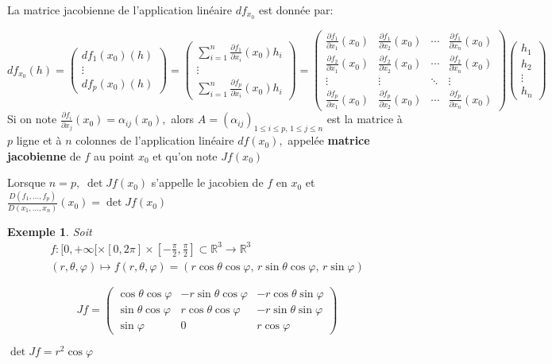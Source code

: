 \documentclass[11pt,a4paper]{report}
\newtheorem{ex}{Exemple}[section]
\begin{document}
La matrice jacobienne de l'application linéaire $df_{x_0}$ est donnée par:

\begin{equation*}
df_{x_0}(h)=
\begin{pmatrix}
d f_1(x_0)(h)\\
\vdots \\
d f_p(x_0)(h)
\end{pmatrix}=
\begin{pmatrix}
\sum\limits_{i=1}^{n}\frac{\partial f_1}{\partial x_i}(x_0) h_i\\
\vdots \\
\sum\limits_{i=1}^{n}\frac{\partial f_p}{\partial x_i}(x_0) h_i
\end{pmatrix}
=\begin{pmatrix}
\frac{\partial f_1}{\partial x_1}(x_0) & \frac{\partial f_1}{\partial x_2}(x_0) & \cdots & \frac{\partial f_1}{\partial x_n}(x_0) \\
\frac{\partial f_2}{\partial x_1}(x_0) & \frac{\partial f_2}{\partial x_2}(x_0) & \cdots & \frac{\partial f_2}{\partial x_n}(x_0) \\
\vdots & \vdots & \ddots & \vdots \\
\frac{\partial f_p}{\partial x_1}(x_0) & \frac{\partial f_p}{\partial x_2}(x_0) & \cdots & \frac{\partial f_p}{\partial x_n}(x_0)
\end{pmatrix}
\begin{pmatrix}
h_1\\
h_2\\
\vdots\\
h_n
\end{pmatrix}
\end{equation*}
Si on note $\frac{\partial f_i}{\partial x_j}(x_0)=\alpha_{ij}(x_0),$ alors $A=(\alpha_{ij})_{1\leq i\leq p,\,1\leq j\leq n}$ est la matrice à $p$ ligne et à $n$ colonnes de l'application linéaire $df(x_0),$ appelée \textbf{matrice jacobienne} de $f$ au point $x_0$ et qu'on note $Jf(x_0)$

Lorsque $n=p,\;\det Jf(x_0)$ s'appelle le jacobien de $f$ en $x_0$ et $\frac{D(f_1,...,f_p)}{D(x_1,...,x_n)}(x_0)=\det Jf(x_0)$
\begin{ex}
Soit
\begin{align*}
f:[0,+\infty[\times [0,2\pi]\times [-\frac{\pi}{2},\frac{\pi}{2}]\subset\mathbb{R}^3\rightarrow \mathbb{R}^3\\
(r,\theta,\varphi)\mapsto f(r,\theta,\varphi)=(r\cos \theta \cos\varphi,\,r\sin\theta\cos\varphi,\,r\sin\varphi)
\end{align*}

\begin{equation*}
Jf=\begin{pmatrix}
\cos \theta \cos\varphi & -r\sin \theta \cos \varphi & -r\cos \theta \sin \varphi \\
\sin \theta \cos \varphi & r\cos \theta \cos \varphi & -r\sin \theta \sin \varphi\\
\sin \varphi & 0 & r\cos \varphi
\end{pmatrix}
\end{equation*}

$\det Jf=r^2\cos \varphi$
\end{ex}
\end{document}
